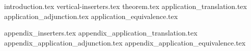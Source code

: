 \documentclass[acmsmall,anonymous,screen,review]{acmart}
\theoremstyle{acmdefinition}
\begin{document}



\maketitle


{introduction.tex}
{vertical-inserters.tex}
{theorem.tex}
{application_translation.tex}
{application_adjunction.tex}
{application_equivalence.tex}




\appendix
{appendix_inserters.tex}
{appendix_application_translation.tex}
{appendix_application_adjunction.tex}
{appendix_application_equivalence.tex}
\end{document}
